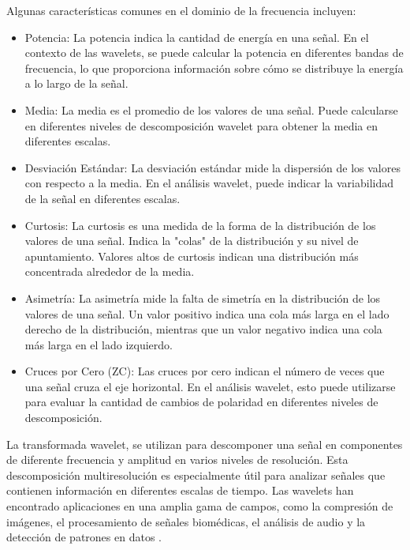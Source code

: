 Algunas características comunes en el dominio de la frecuencia incluyen:
\begin{itemize}
    \item Potencia: La potencia indica la cantidad de energía en una señal. En el contexto de las wavelets, se puede calcular la potencia en diferentes bandas de frecuencia, lo que proporciona información sobre cómo se distribuye la energía a lo largo de la señal.
    \item Media: La media es el promedio de los valores de una señal. Puede calcularse en diferentes niveles de descomposición wavelet para obtener la media en diferentes escalas.
    \item Desviación Estándar: La desviación estándar mide la dispersión de los valores con respecto a la media. En el análisis wavelet, puede indicar la variabilidad de la señal en diferentes escalas.
    \item Curtosis: La curtosis es una medida de la forma de la distribución de los valores de una señal. Indica la "colas" de la distribución y su nivel de apuntamiento. Valores altos de curtosis indican una distribución más concentrada alrededor de la media.
    \item Asimetría: La asimetría mide la falta de simetría en la distribución de los valores de una señal. Un valor positivo indica una cola más larga en el lado derecho de la distribución, mientras que un valor negativo indica una cola más larga en el lado izquierdo.
    \item Cruces por Cero (ZC): Las cruces por cero indican el número de veces que una señal cruza el eje horizontal. En el análisis wavelet, esto puede utilizarse para evaluar la cantidad de cambios de polaridad en diferentes niveles de descomposición.
\end{itemize}

La transformada wavelet, se utilizan para descomponer una señal en componentes de diferente frecuencia y amplitud en varios niveles de resolución. Esta descomposición multiresolución es especialmente útil para analizar señales que contienen información en diferentes escalas de tiempo. Las wavelets han encontrado aplicaciones en una amplia gama de campos, como la compresión de imágenes, el procesamiento de señales biomédicas, el análisis de audio y la detección de patrones en datos \cite{wavelet_def}.

